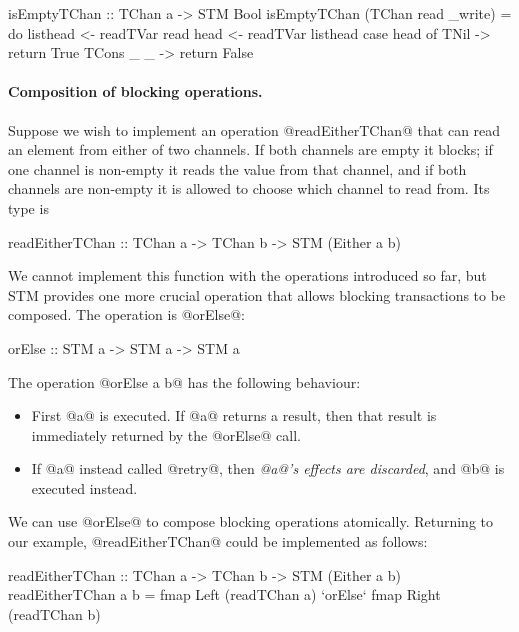\begin{haskell}
isEmptyTChan :: TChan a -> STM Bool
isEmptyTChan (TChan read _write) = do
  listhead <- readTVar read
  head <- readTVar listhead
  case head of
    TNil -> return True
    TCons _ _ -> return False
\end{haskell}

\paragraph{Composition of blocking operations.}  Suppose we wish to
implement an operation @readEitherTChan@ that can read an element from
either of two channels.  If both channels are empty it blocks; if one
channel is non-empty it reads the value from that channel, and if both
channels are non-empty it is allowed to choose which channel to read
from.  Its type is

\begin{haskell}
readEitherTChan :: TChan a -> TChan b -> STM (Either a b)
\end{haskell}

\noindent We cannot implement this function with the operations
introduced so far, but STM provides one more crucial operation that
allows blocking transactions to be composed.  The operation is
@orElse@:

\begin{haskell}
orElse :: STM a -> STM a -> STM a
\end{haskell}

\noindent The operation @orElse a b@ has the following behaviour:

\begin{itemize}
\item First @a@ is executed.  If @a@ returns a result, then that
  result is immediately returned by the @orElse@ call.
\item If @a@ instead called @retry@, then \emph{@a@'s effects are
  discarded}, and @b@ is executed instead.
\end{itemize}

We can use @orElse@ to compose blocking operations atomically.
Returning to our example, @readEitherTChan@ could be implemented as
follows:

\begin{haskell}
readEitherTChan :: TChan a -> TChan b -> STM (Either a b)
readEitherTChan a b =
  fmap Left (readTChan a)
    `orElse`
  fmap Right (readTChan b)
\end{haskell}

